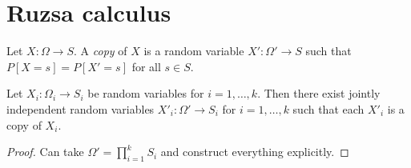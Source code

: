 \chapter{Ruzsa calculus}

\begin{definition}[Copy]\label{copy-def}  Let $X : \Omega \to S$.  A \emph{copy} of $X$ is a random variable $X' : \Omega' \to S$ such that $P[X=s] = P[X'=s]$ for all $s \in S$.
\end{definition}

\begin{lemma}\label{independent-exist}  Let $X_i : \Omega_i \to S_i$ be random variables for $i=1,\dots,k$.  Then there exist jointly independent random variables $X'_i: \Omega' \to S_i$ for $i=1,\dots,k$ such that each $X'_i$ is a copy of $X_i$.
\end{lemma}

\begin{proof} Can take $\Omega' = \prod_{i=1}^k S_i$ and construct everything explicitly.
\end{proof}


